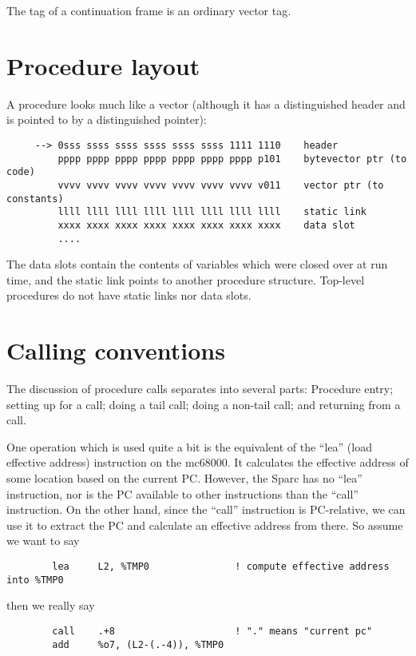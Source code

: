 The tag of a continuation frame is an ordinary vector tag.

\section{Procedure layout}

A procedure looks much like a vector (although it has a distinguished
header and is pointed to by a distinguished pointer):

\begin{verbatim}
     --> 0sss ssss ssss ssss ssss ssss 1111 1110    header
         pppp pppp pppp pppp pppp pppp pppp p101    bytevector ptr (to code)
         vvvv vvvv vvvv vvvv vvvv vvvv vvvv v011    vector ptr (to constants)
         llll llll llll llll llll llll llll llll    static link
         xxxx xxxx xxxx xxxx xxxx xxxx xxxx xxxx    data slot
         ....
\end{verbatim}

The data slots contain the contents of variables which were closed
over at run time, and the static link points to another procedure
structure. Top-level procedures do not have static links nor data slots.


\section{Calling conventions}

The discussion of procedure calls separates into several parts:
Procedure entry; setting up for a call; doing a tail call; doing a
non-tail call; and returning from a call. 

One operation which is used quite a bit is the equivalent of the ``lea''
(load effective address) instruction on the mc68000. It calculates the
effective address of some location based on the current PC.  However,
the Sparc has no ``lea'' instruction, nor is the PC available to other
instructions than the ``call'' instruction. On the other hand, since the
``call'' instruction is PC-relative, we can use it to extract the PC and
calculate an effective address from there. So assume we want to say

\begin{verbatim}
        lea     L2, %TMP0               ! compute effective address into %TMP0
\end{verbatim}

then we really say

\begin{verbatim}
        call    .+8                     ! "." means "current pc"
        add     %o7, (L2-(.-4)), %TMP0
\end{verbatim}

